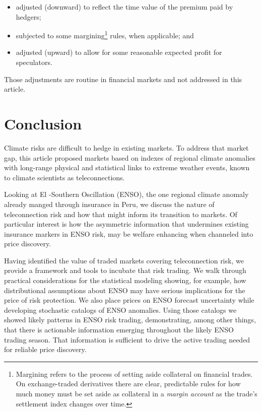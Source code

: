 \documentclass[article]{jss}
\begin{document}
\begin{itemize}
\itemsep1pt\parskip0pt
\item
  adjusted (downward) to reflect the time value of the premium paid by
  hedgers;
\item
  subjected to some margining\footnote{Margining refers to the process
    of setting aside collateral on financial trades. On exchange-traded
    derivatives there are clear, predictable rules for how much money
    must be set aside as collateral in a \emph{margin account} as the
    trade's settlement index changes over time.} rules, when applicable;
  and
\item
  adjusted (upward) to allow for some reasonable expected profit for
  speculators.
\end{itemize}

Those adjustments are routine in financial markets and not addressed in
this article.

\section{Conclusion}\label{conclusion}

Climate risks are difficult to hedge in existing markets. To address
that market gap, this article proposed markets based on indexes of
regional climate anomalies with long-range physical and statistical
links to extreme weather events, known to climate scientists as
teleconnections.

Looking at El -Southern Oscillation (ENSO), the one
regional climate anomaly already manged through insurance in Peru, we
discuss the nature of teleconnection risk and how that might inform its
transition to markets. Of particular interest is how the asymmetric
information that undermines existing insurance markers in ENSO risk, may
be welfare enhancing when channeled into price discovery.

Having identified the value of traded markets covering teleconnection
risk, we provide a framework and tools to incubate that risk trading. We
walk through practical considerations for the statistical modeling
showing, for example, how distributional assumptions about ENSO may have
serious implications for the price of risk protection. We also place
prices on ENSO forecast uncertainty while developing stochastic catalogs
of ENSO anomalies. Using those catalogs we showed likely patterns in
ENSO risk trading, demonstrating, among other things, that there is
actionable information emerging throughout the likely ENSO trading
season. That information is sufficient to drive the active trading
needed for reliable price discovery.
\end{document}
